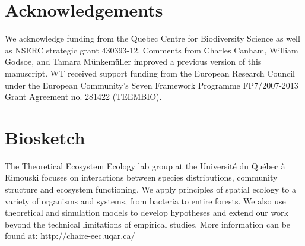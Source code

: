 \documentclass[11pt]{article}
\begin{document}
\section*{Acknowledgements}
We acknowledge funding from the Quebec Centre for Biodiversity Science as well as NSERC strategic grant 430393-12. Comments from Charles Canham, William Godsoe, and Tamara Münkemüller improved a previous version of this manuscript. WT received support funding from the European Research Council under the European Community's Seven Framework Programme FP7/2007-2013 Grant Agreement no. 281422 (TEEMBIO). 

\nolinenumbers

%
%

\renewcommand\refname{Literature Cited}
{}



%
%

\section*{Biosketch}
The Theoretical Ecosystem Ecology lab group at the Université du Québec à Rimouski focuses on interactions between species distributions, community structure and ecosystem functioning.
We apply principles of spatial ecology to a variety of organisms and systems, from bacteria to entire forests.
We also use theoretical and simulation models to develop hypotheses and extend our work beyond the technical limitations of empirical studies.
More information can be found at: http://chaire-eec.uqar.ca/

%
%

\newpage
\end{document}
